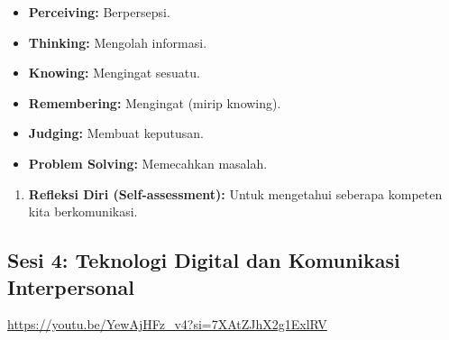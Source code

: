 \documentclass[
  letterpaper,
  DIV=11,
  numbers=noendperiod]{scrreprt}
\providecommand{\tightlist}{%
  \setlength{\itemsep}{0pt}\setlength{\parskip}{0pt}}
\begin{document}
\begin{itemize}
\tightlist
\item
  \textbf{Perceiving:} Berpersepsi.
\item
  \textbf{Thinking:} Mengolah informasi.
\item
  \textbf{Knowing:} Mengingat sesuatu.
\item
  \textbf{Remembering:} Mengingat (mirip knowing).
\item
  \textbf{Judging:} Membuat keputusan.
\item
  \textbf{Problem Solving:} Memecahkan masalah.
\end{itemize}

\begin{enumerate}
\def\labelenumi{\arabic{enumi}.}
\tightlist
\item
  \textbf{Refleksi Diri (Self-assessment):} Untuk mengetahui seberapa
  kompeten kita berkomunikasi.
\end{enumerate}

\subsection{Sesi 4: Teknologi Digital dan Komunikasi
Interpersonal}\label{sesi-4-teknologi-digital-dan-komunikasi-interpersonal}

\url{https://youtu.be/YewAjHFz_v4?si=7XAtZJhX2g1ExlRV}
\end{document}
